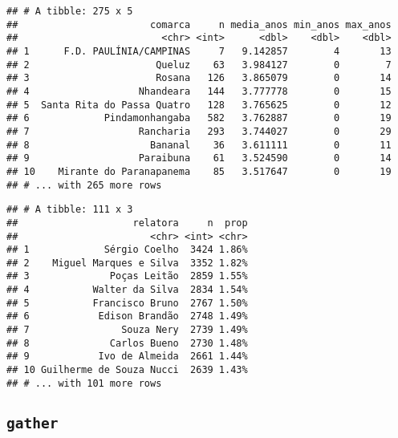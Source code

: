 \documentclass[]{book}
\newenvironment{Shaded}{\begin{snugshade}}{\end{snugshade}}
\newcommand{\KeywordTok}[1]{\textcolor[rgb]{0.13,0.29,0.53}{\textbf{{#1}}}}
\newcommand{\DataTypeTok}[1]{\textcolor[rgb]{0.13,0.29,0.53}{{#1}}}
\newcommand{\StringTok}[1]{\textcolor[rgb]{0.31,0.60,0.02}{{#1}}}
\newcommand{\OtherTok}[1]{\textcolor[rgb]{0.56,0.35,0.01}{{#1}}}
\newcommand{\NormalTok}[1]{{#1}}
\begin{document}
\begin{verbatim}
## # A tibble: 275 x 5
##                       comarca     n media_anos min_anos max_anos
##                         <chr> <int>      <dbl>    <dbl>    <dbl>
## 1      F.D. PAULÍNIA/CAMPINAS     7   9.142857        4       13
## 2                      Queluz    63   3.984127        0        7
## 3                      Rosana   126   3.865079        0       14
## 4                   Nhandeara   144   3.777778        0       15
## 5  Santa Rita do Passa Quatro   128   3.765625        0       12
## 6             Pindamonhangaba   582   3.762887        0       19
## 7                   Rancharia   293   3.744027        0       29
## 8                     Bananal    36   3.611111        0       11
## 9                   Paraibuna    61   3.524590        0       14
## 10    Mirante do Paranapanema    85   3.517647        0       19
## # ... with 265 more rows
\end{verbatim}

\begin{Shaded}
\end{Shaded}

\begin{verbatim}
## # A tibble: 111 x 3
##                    relatora     n  prop
##                       <chr> <int> <chr>
## 1             Sérgio Coelho  3424 1.86%
## 2    Miguel Marques e Silva  3352 1.82%
## 3              Poças Leitão  2859 1.55%
## 4           Walter da Silva  2834 1.54%
## 5           Francisco Bruno  2767 1.50%
## 6            Edison Brandão  2748 1.49%
## 7                Souza Nery  2739 1.49%
## 8              Carlos Bueno  2730 1.48%
## 9            Ivo de Almeida  2661 1.44%
## 10 Guilherme de Souza Nucci  2639 1.43%
## # ... with 101 more rows
\end{verbatim}

\subsection{\texorpdfstring{\texttt{gather}}{gather}}\label{gather}
\end{document}
